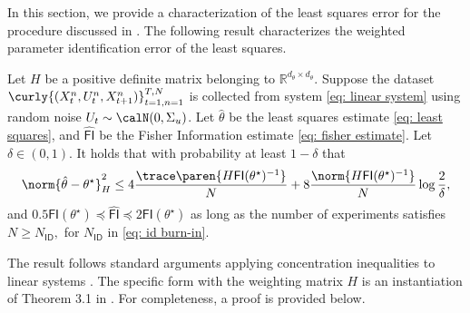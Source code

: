 In this section, we provide a characterization of the least squares error for the procedure discussed in . The following result characterizes the weighted parameter identification error of the least squares. %

\begin{lemma}
    \label{thm: identification bound}
    Let $H$ be a positive definite matrix belonging to $\mathbb{R}^{d_{\theta}\times d_{\theta}}$. Suppose the dataset $\curly{(X_t^n, U_t^n, X_{t+1}^n)}_{t=1, n=1}^{T,N}$ is collected from system \eqref{eq: linear system} using random noise $U_t \sim \calN(0, \Sigma_u)$. Let $\hat \theta$ be the least squares estimate \eqref{eq: least squares}, and $\hat {\mathsf{FI}}$ be the Fisher Information estimate \eqref{eq: fisher estimate}. Let $\delta \in (0,1)$. It holds that with probability at least $1-\delta$ that 
    \begin{align}
        \norm{\hat \theta - \theta^\star}_H^2 \leq 4 \frac{\trace\paren{H \mathsf{FI}(\theta^\star)^{-1}}}{N} + 8 \frac{\norm{H \mathsf{FI}(\theta^\star)^{-1}}}{N} \log\frac{2}{\delta},
    \end{align}
    and
        $0.5 \mathsf{FI}(\theta^\star) \preceq \hat{\mathsf{FI}} \preceq 2 \mathsf{FI}(\theta^\star)$
    as long as the number of experiments satisfies 
        $N \geq N_{\mathsf{ID}},$
    for $N_{\mathsf{ID}}$ in \eqref{eq: id burn-in}.  
\end{lemma}
The result follows standard arguments applying concentration inequalities to linear systems \cite{ziemann2023tutorial, tu2024learning}. The specific form with the weighting matrix $H$ is an instantiation of Theorem 3.1 in \cite{lee2024active}. For completeness, a proof is provided below. 

